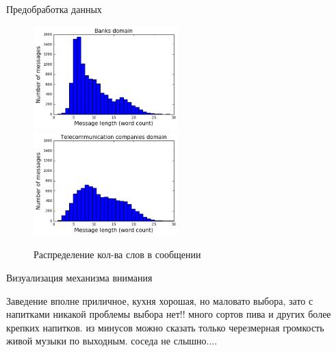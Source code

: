 \documentclass{beamer}
\begin{document}
\begin{frame}{Предобработка данных}

\begin{figure}[!h]
\caption{Распределение кол-ва слов в сообщении}
  \includegraphics[width=0.5\textwidth]{images/mess_len_bank.png}
    \includegraphics[width=0.5\textwidth]{images/mess_len_tkk2.png}
\end{figure}

\end{frame}
\begin{frame}{Визуализация механизма внимания}

\colorbox{yellow!14}{Заведение}
\colorbox{yellow!41}{вполне}
\colorbox{yellow!62}{приличное,}
\colorbox{yellow!78}{кухня}
\colorbox{yellow!99}{хорошая,}
\colorbox{yellow!27}{но}
\colorbox{yellow!25}{маловато}
\colorbox{yellow!11}{выбора,}
\colorbox{yellow!8}{зато}
\colorbox{yellow!2}{с}
\colorbox{yellow!2}{напитками}
\colorbox{yellow!2}{никакой}
\colorbox{yellow!2}{проблемы}
\colorbox{yellow!3}{выбора}
\colorbox{yellow!2}{нет!!}
\colorbox{yellow!2}{много}
\colorbox{yellow!2}{сортов}
\colorbox{yellow!2}{пива}
\colorbox{yellow!3}{и}
\colorbox{yellow!2}{других}
\colorbox{yellow!1}{более}
\colorbox{yellow!2}{крепких}
\colorbox{yellow!1}{напитков.}
\colorbox{yellow!1}{из}
\colorbox{yellow!3}{минусов}
\colorbox{yellow!3}{можно}
\colorbox{yellow!4}{сказать}
\colorbox{yellow!4}{только}
\colorbox{yellow!10}{черезмерная}
\colorbox{yellow!8}{громкость}
\colorbox{yellow!12}{живой}
\colorbox{yellow!8}{музыки}
\colorbox{yellow!4}{по}
\colorbox{yellow!5}{выходным.}
\colorbox{yellow!6}{соседа}
\colorbox{yellow!11}{не}
\colorbox{yellow!11}{слышно....}

\end{frame}
\end{document}
